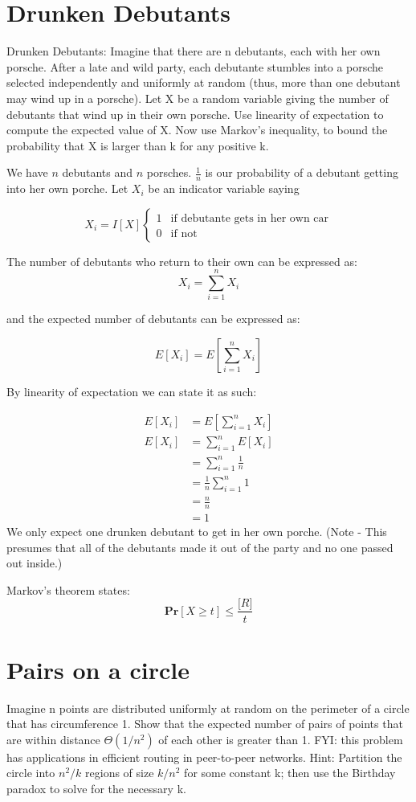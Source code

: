 \documentclass[titlepage]{article}\usepackage[]{graphicx}\usepackage[]{color}
\begin{document}
  \section{ Drunken Debutants}
Drunken Debutants: Imagine that there are n debutants, each with her own
porsche. After a late and wild party, each debutante stumbles into a porsche
selected independently and uniformly at random (thus, more than one debutant
may wind up in a porsche). Let X be a random variable giving the number of
debutants that wind up in their own porsche. Use linearity of expectation to
compute the expected value of X. Now use Markov’s inequality, to bound the
probability that X is larger than k for any positive k.

We have $n$ debutants and $n$ porsches. 
$\frac{1}{n}$ is our probability of a debutant getting into her own porche.
Let $X_i$ be an indicator variable saying 

\[
	X_i = I[X]
  \begin{cases}
   1 & \text{if debutante gets in her own car} \\
   0       & \text{if not } 
  \end{cases}
\]

The number of debutants who return to their own can be expressed as:
\[ X_i = \sum_{i=1}^n X_i \]

and the expected number of debutants can be expressed as:

\[ E [X_i] = E \left[ \sum_{i=1}^n X_i \right] \]

By linearity of expectation we can state it as such:

\begin{align*}
	E [X_i] &= E \left[ \sum_{i=1}^n X_i \right] \\
	E [X_i] &=  \sum_{i=1}^n E[X_i] \\ 
	&=  \sum_{i=1}^n \frac{1}{n} \\ 
	&=  \frac{1}{n} \sum_{i=1}^n 1 \\
	&= \frac{n}{n} \\
	& = 1
\end{align*}
We only expect one drunken debutant to get in her own porche. (Note - This presumes
that all of the debutants made it out of the party and no one passed out
inside.)


Markov's theorem states:
\[ \mathbf{Pr} \left[ X \geq t \right] \leq \frac{\mathbf[R]}{t} \]



  \section{ Pairs on a circle}
Imagine n points are distributed uniformly at random on the perimeter of a
circle that has circumference 1. Show that the expected number of pairs of
points that are within distance $\Theta(1/n^2)$ of each other is greater than 1. FYI:
this problem has applications in efficient routing in peer-to-peer networks.
Hint: Partition the circle into $n^2/k$ regions of size $k/n^2$ for some constant
k; then use the Birthday paradox to solve for the necessary k.

  
\end{document}
